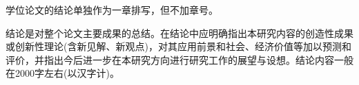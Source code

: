\begin{summary}
    学位论文的结论单独作为一章排写，但不加章号。
    
        结论是对整个论文主要成果的总结。在结论中应明确指出本研究内容的创造性成果或创新性理论(含新见解、新观点)，对其应用前景和社会、经济价值等加以预测和评价，并指出今后进一步在本研究方向进行研究工作的展望与设想。结论内容一般在2000字左右(以汉字计)。
    
    \end{summary}
    